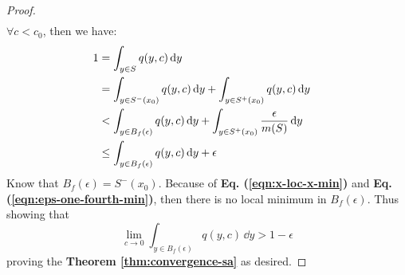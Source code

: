 \begin{theorem}
\begin{proof}
\begin{eqnarray}
\end{eqnarray}
$\forall c < c_0$, then we have:
\begin{align}
    1 & = \int_{y \in S} q(y,c) \, \mathrm{d} y & \notag \\
    & = \int_{y \in S^-(x_0)} q(y,c) \, \mathrm{d} y + \int_{y \in S^+(x_0)} q(y,c) \, \mathrm{d} y & \notag \\
    & < \int_{y \in B_f(\epsilon)} q(y,c) \, \mathrm{d} y + \int_{y \in S^+(x_0)} \dfrac{\epsilon}{m(S)} \, \mathrm{d} y & \notag \\
    & \leq \int_{y \in B_f(\epsilon)} q(y,c) \, \mathrm{d} y + \epsilon 
\end{align}
Know that $B_f(\epsilon) = S^-(x_0)$. Because of \textbf{Eq. (\ref{eqn:x-loc-x-min})} and \textbf{Eq. (\ref{eqn:eps-one-fourth-min})}, then there is no local minimum in $B_f(\epsilon)$. Thus showing that
\begin{equation}
     \lim_{c \rightarrow 0} \int_{y \in B_f(\epsilon)} q(y,c) \, \dd y > 1-\epsilon
\end{equation}
proving the \textbf{Theorem \ref{thm:convergence-sa}} as desired.
\end{proof}
\end{theorem}